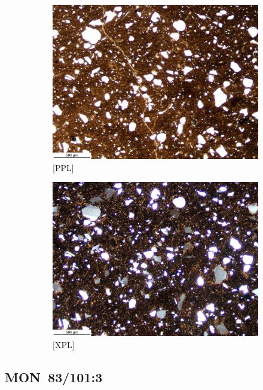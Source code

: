 \documentclass[a4paper]{article}
\begin{document}
\begin{figure}[H]
	\centering
	\begin{subfigure}[t]{.49\textwidth}
		\includegraphics[width=\textwidth]{ThinSections/50-3_4x_PPL.jpg}
		\caption{[PPL]}
	\end{subfigure}\hspace{.5em}\hfill
	\begin{subfigure}[t]{.49\textwidth}
		\includegraphics[width=\textwidth]{ThinSections/50-3_4x_XPL.jpg}
		\caption{[XPL]}
	\end{subfigure}
	\caption{}
	\label{fig:50_mon}
\end{figure}

\newpage\subsection{MON~83/101:3 \citep[mon\#51; Fig.~\ref{fig:wafmon.pottery}.3; \ref{fig:thinsections}D; Monkoto style;][506 Pl.~72.6]{Wotzka.1995}}
\end{document}
